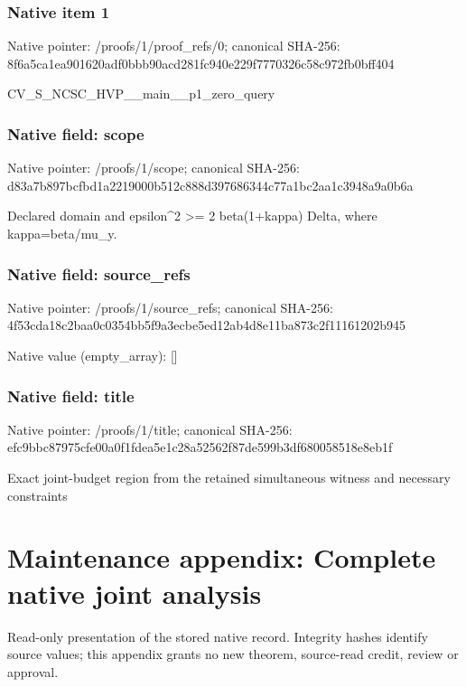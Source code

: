 \documentclass[10pt,a4paper]{article}
\begin{document}
\subsubsection{Native item 1}
Native pointer: /proofs/1/proof\_\allowbreak{}refs/0; canonical SHA-256: 8f6a5ca1ea901620adf0bbb90acd281fc940e229f7770326c58c972fb0bff404

\begingroup\raggedright\sloppy CV\_\allowbreak{}S\_\allowbreak{}NCSC\_\allowbreak{}HVP\_\allowbreak{}\_\allowbreak{}main\_\allowbreak{}\_\allowbreak{}p1\_\allowbreak{}zero\_\allowbreak{}query\par\endgroup

\subsubsection{Native field: scope}
Native pointer: /proofs/1/scope; canonical SHA-256: d83a7b897bcfbd1a2219000b512c888d397686344c77a1bc2aa1c3948a9a0b6a

\begingroup\raggedright\sloppy Declared domain and epsilon\textasciicircum{}2 >=\allowbreak{} 2 beta(1+kappa) Delta,\allowbreak{} where kappa=\allowbreak{}beta/\allowbreak{}mu\_\allowbreak{}y.\par\endgroup

\subsubsection{Native field: source\_\allowbreak{}refs}
Native pointer: /proofs/1/source\_\allowbreak{}refs; canonical SHA-256: 4f53cda18c2baa0c0354bb5f9a3ecbe5ed12ab4d8e11ba873c2f11161202b945

Native value (empty\_\allowbreak{}array): []

\subsubsection{Native field: title}
Native pointer: /proofs/1/title; canonical SHA-256: efc9bbc87975cfe00a0f1fdea5e1c28a52562f87de599b3df680058518e8eb1f

\begingroup\raggedright\sloppy Exact joint-budget region from the retained simultaneous witness and necessary constraints\par\endgroup

\section{Maintenance appendix: Complete native joint analysis}
Read-only presentation of the stored native record. Integrity hashes identify source values; this appendix grants no new theorem, source-read credit, review or approval.
\end{document}
